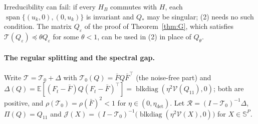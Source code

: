 \documentclass[11pt]{article}
\theoremstyle{remark}
\newcommand{\E}{\mathbb{E}}
\begin{document}
Irreducibility can fail: if every $H_{B}$ commutes with $H$, each $\operatorname{span}\{(u_k,0),(0,u_k)\}$ is invariant and $Q_*$ may be singular; (2) needs no such condition. The matrix $Q_\varepsilon$ of the proof of Theorem~\ref{thm:G}, which satisfies $\mathcal T(Q_\varepsilon)\preceq\theta Q_\varepsilon$ for some $\theta<1$, can be used in (2) in place of $Q_\theta$.

\paragraph{The regular splitting and the spectral gap.} Write $\mathcal T=\mathcal T_0+\Delta$ with $\mathcal T_0(Q)=\bar FQ\bar F^\top$ (the noise-free part) and $\Delta(Q)=\E[(F_t-\bar F)Q(F_t-\bar F)^\top]=\operatorname{blkdiag}(\eta^2\mathcal V(Q_{11}),0)$; both are positive, and $\rho(\mathcal T_0)=\rho(\bar F)^2<1$ for $\eta\in(0,\eta_{\mathrm{det}})$. Let $\mathcal R=(I-\mathcal T_0)^{-1}\Delta$, $\Pi(Q)=Q_{11}$ and $\mathcal J(X)=(I-\mathcal T_0)^{-1}\big(\operatorname{blkdiag}(\eta^2\mathcal V(X),0)\big)$ for $X\in\mathbb S^P$.
\end{document}
